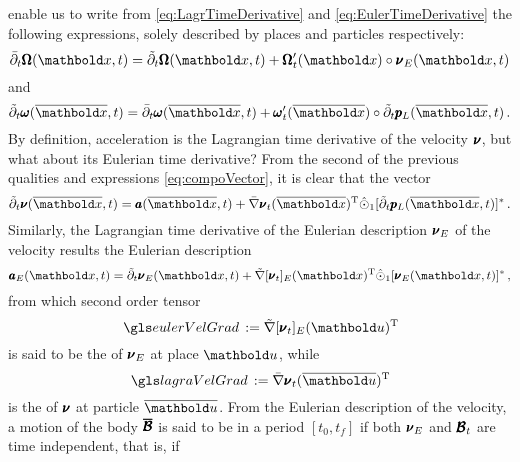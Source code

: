 enable us to write from \eqref{eq:LagrTimeDerivative} and \eqref{eq:EulerTimeDerivative} the following expressions, solely described by places and particles respectively:   
\begin{equation}
\bar{\partial}_t\tnr{\Omega}({\vto{x}},t)=\tilde{\partial}_t\tnr{\Omega}({\vto{x}},t)+\tnr{\Omega}_t'(\vto{x})\circ\tnr{\nu}_E(\vto{x},t)
\end{equation}
and
\begin{equation}
\tilde{\partial}_t\tnr{\omega}(\overline{\vto{x}},t)=\bar{\partial}_t\tnr{\omega}(\overline{\vto{x}},t)+\tnr{\omega}_t'(\overline{\vto{x}})\circ\tilde{\partial}_t \tnr{p}_L(\overline{\vto{x}},t)\,.
\end{equation}
By definition, acceleration is the Lagrangian time derivative of the velocity $\pmb{\nu}$, but what about its Eulerian time derivative? From the second of the previous qualities and expressions \eqref{eq:compoVector}, it is clear that the vector 
\begin{equation}
\tilde{\partial}_t\tnr{\nu}(\overline{\vto{x}},t)=\tnr{a}(\overline{\vto{x}},t)+\fua{\bar{\nabla}\tnr{\nu}_t}{\overline{\vto{x}}}^{\text{T}}\hat{\odot}_1[\tilde{\partial}_t \tnr{p}_L(\overline{\vto{x}},t)]^*\,.
\end{equation}
Similarly, the Lagrangian time derivative of the Eulerian description $\pmb{\nu}_E$ of the velocity results the Eulerian description  
\begin{equation}
\tnr{a}_E(\vto{x},t)=\tilde{\partial}_t\tnr{\nu}_E({\vto{x}},t)+\fua{\tilde{\nabla}[\tnr{\nu}_t]_E}{{\vto{x}}}^{\text{T}}\hat{\odot}_1[{\tnr{\nu}_E}(\vto{x},t)]^*\,,
\end{equation}
from which second order tensor 
 \begin{equation}\label{eq:eulerVelocityGrad}
\gloref{eulerVelGrad}:=\fua{\tilde{\nabla}[\tnr{\nu}_t]_E}{{\vto{u}}}^{\text{T}}
 \end{equation}
is said to be the  of $\pmb{\nu}_E$ at place $\vto{u}$, while
 \begin{equation}\label{eq:lagrangVelocityGrad}
\gloref{lagraVelGrad}:=\fua{\bar{\nabla}\tnr{\nu}_t}{\overline{\vto{u}}}^{\text{T}}
 \end{equation}
is the  of $\pmb{\nu}$ at particle $\overline{\vto{u}}$. From the Eulerian description of the velocity, a motion of the body $\pmb{\overline{\mathcal{B}}}$ is said to be  in a period $[t_0,t_f]$ if both $\pmb{\nu}_E$ and $\pmb{\mathcal{B}}_t$  are time independent, that is, if
